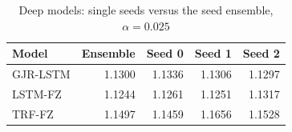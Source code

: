 \begin{table}[htbp]
\centering
\footnotesize
\caption{Deep models: single seeds versus the seed ensemble, $\alpha=0.025$}
\label{tab:seeds}
\begin{tabular}{lrrrr}
\toprule
Model & Ensemble & Seed 0 & Seed 1 & Seed 2 \\
\midrule
GJR-LSTM & 1.1300 & 1.1336 & 1.1306 & 1.1297 \\
LSTM-FZ & 1.1244 & 1.1261 & 1.1251 & 1.1317 \\
TRF-FZ & 1.1497 & 1.1459 & 1.1656 & 1.1528 \\
\bottomrule
\end{tabular}
\end{table}